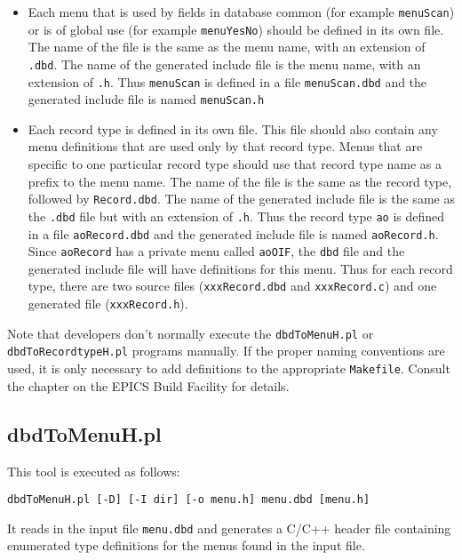 \begin{itemize}
\item Each menu that is used by fields in database common (for example \verb|menuScan|) or is of global use (for example \verb|menuYesNo|) should be defined in its own file.
The name of the file is the same as the menu name, with an extension of \verb|.dbd|.
The name of the generated include file is the menu name, with an extension of \verb|.h|.
Thus \verb|menuScan| is defined in a file \verb|menuScan.dbd| and the generated include file is named \verb|menuScan.h|

\item Each record type is defined in its own file.
This file should also contain any menu definitions that are used only by that record type.
Menus that are specific to one particular record type should use that record type name as a prefix to the menu name.
The name of the file is the same as the record type, followed by \verb|Record.dbd|.
The name of the generated include file is the same as the \verb|.dbd| file but with an extension of \verb|.h|.
Thus the record type \verb|ao| is defined in a file \verb|aoRecord.dbd| and the generated include file is named \verb|aoRecord.h|.
Since \verb|aoRecord| has a private menu called \verb|aoOIF|, the \verb|dbd| file and the generated include file will have definitions for this menu.
Thus for each record type, there are two source files (\verb|xxxRecord.dbd| and \verb|xxxRecord.c|) and one generated file (\verb|xxxRecord.h|).
\end{itemize}

Note that developers don't normally execute the \verb|dbdToMenuH.pl| or \verb|dbdToRecordtypeH.pl| programs manually.
If the proper naming conventions are used, it is only necessary to add definitions to the appropriate \verb|Makefile|.
Consult the chapter on the EPICS Build Facility for details.

\subsection{dbdToMenuH.pl}

This tool is executed as follows:

\begin{lstlisting}[language=dbd]
dbdToMenuH.pl [-D] [-I dir] [-o menu.h] menu.dbd [menu.h]
\end{lstlisting}

It reads in the input file \verb|menu.dbd| and generates a C/C++ header file containing enumerated type definitions for the menus found in the input file.

